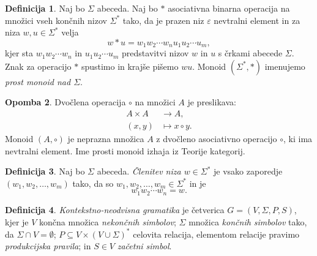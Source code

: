 \documentclass{amsart}
\theoremstyle{definition}
\newtheorem{definicija}{Definicija}[section]
\newtheorem{opomba}[definicija]{Opomba}
\theoremstyle{plain} %
\begin{document}
\begin{definicija}
    
    Naj bo $ \Sigma $ abeceda. Naj bo $ * $ asociativna binarna operacija na množici vseh končnih nizov $ \Sigma^* $
    tako, da je prazen niz $ \varepsilon $ nevtralni element in za niza $ w, u \in \Sigma^* $ velja
    \[
        w*u = w_1w_2 \cdots w_nu_1u_2 \cdots u_m,
    \]
    kjer sta $ w_1w_2 \cdots w_n $ in $ u_1u_2 \cdots u_m $ predstavitvi nizov $ w $ in $ u $ s črkami abecede $ \Sigma $.
    Znak za operacijo $ * $ spustimo in krajše pišemo $ wu $. Monoid $ (\Sigma^*, *) $ imenujemo 
    \textit{prost monoid nad $ \Sigma $}.

\end{definicija}

\begin{opomba}
    
    Dvočlena operacija $ \circ $ na množici $ A $ je preslikava:
    \begin{align*}
        A \times A &\to A, \\
        (x,y) &\mapsto x \circ y.
    \end{align*}
    Monoid $ (A, \circ) $ je neprazna množica $ A $ z dvočleno asociativno operacijo $ \circ $,
    ki ima nevtralni element. Ime prosti monoid izhaja iz Teorije kategorij.

\end{opomba}

\begin{definicija}

    Naj bo $ \Sigma $ abeceda. \textit{Členitev niza $ w \in \Sigma^*$} je vsako zaporedje $ (w_1, w_2, \ldots, w_m ) $ tako,
    da so $ w_1, w_2, \ldots, w_m \in \Sigma^* $ in je
    \[
        w_1w_2 \cdots w_n = w.
    \]

\end{definicija}

\begin{definicija}

    \textit{Kontekstno-neodvisna gramatika} je četverica $ G = (V, \Sigma, P, S) $, kjer je
    $ V $ končna množica \textit{nekončnih simbolov}; $ \Sigma $ množica \textit{končnih simbolov}
    tako, da $ \Sigma \cap V = \emptyset $; $ P \subseteq V \times ( V \cup \Sigma )^* $ celovita relacija,
    elementom relacije pravimo \textit{produkcijska pravila}; in $ S \in V $ \textit{začetni simbol}.

\end{definicija}

    
\end{document}
